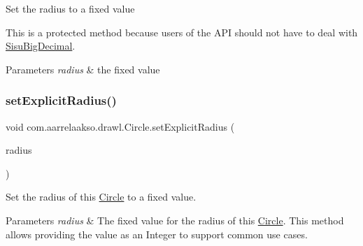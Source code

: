Set the radius to a fixed value 

This is a protected method because users of the A\+PI should not have to deal with \hyperlink{classcom_1_1aarrelaakso_1_1drawl_1_1_sisu_big_decimal}{Sisu\+Big\+Decimal}.


\begin{DoxyParams}{Parameters}
{\em radius} & the fixed value \\
\hline
\end{DoxyParams}
\mbox{\label{classcom_1_1aarrelaakso_1_1drawl_1_1_circle_af34a59acf0e1fc33777aca1b9be7b23d}} 
\subsubsection{\texorpdfstring{set\+Explicit\+Radius()}{setExplicitRadius()}\hspace{0.1cm}{\footnotesize\ttfamily [2/2]}}
{\footnotesize\ttfamily void com.\+aarrelaakso.\+drawl.\+Circle.\+set\+Explicit\+Radius (\begin{DoxyParamCaption}\item[{@Not\+Null Integer}]{radius }\end{DoxyParamCaption})}

Set the radius of this \hyperlink{classcom_1_1aarrelaakso_1_1drawl_1_1_circle}{Circle} to a fixed value.


\begin{DoxyParams}{Parameters}
{\em radius} & The fixed value for the radius of this \hyperlink{classcom_1_1aarrelaakso_1_1drawl_1_1_circle}{Circle}. This method allows providing the value as an Integer to support common use cases. \\
\hline
\end{DoxyParams}
\mbox{\label{classcom_1_1aarrelaakso_1_1drawl_1_1_circle_aff1c4d184a3234f987a95b673f91bf18}} 
